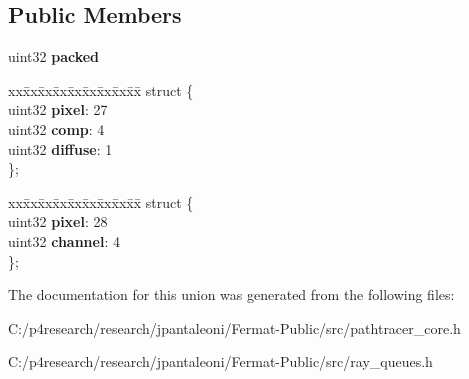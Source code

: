 \subsection*{Public Members}
\begin{DoxyCompactItemize}
\item 
\mbox{\label{union_pixel_info_ab677c8b10c956d02631657ef7f28bf43}} 
uint32 {\bfseries packed}
\item 
\mbox{\label{union_pixel_info_a4b22838a8ee477577f2491da1de8914d}} 
\begin{tabbing}
xx\=xx\=xx\=xx\=xx\=xx\=xx\=xx\=xx\=\kill
struct \{\\
\>uint32 {\bfseries pixel}: 27\\
\>uint32 {\bfseries comp}: 4\\
\>uint32 {\bfseries diffuse}: 1\\
\}; \\

\end{tabbing}\item 
\mbox{\label{union_pixel_info_a6c937a0d866bd704d1e863f19cd0dc97}} 
\begin{tabbing}
xx\=xx\=xx\=xx\=xx\=xx\=xx\=xx\=xx\=\kill
struct \{\\
\>uint32 {\bfseries pixel}: 28\\
\>uint32 {\bfseries channel}: 4\\
\}; \\

\end{tabbing}\end{DoxyCompactItemize}


The documentation for this union was generated from the following files\+:\begin{DoxyCompactItemize}
\item 
C\+:/p4research/research/jpantaleoni/\+Fermat-\/\+Public/src/pathtracer\+\_\+core.\+h\item 
C\+:/p4research/research/jpantaleoni/\+Fermat-\/\+Public/src/ray\+\_\+queues.\+h\end{DoxyCompactItemize}
